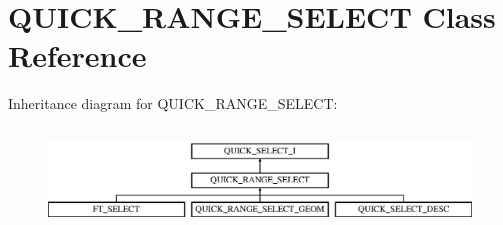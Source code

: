 \hypertarget{classQUICK__RANGE__SELECT}{}\section{Q\+U\+I\+C\+K\+\_\+\+R\+A\+N\+G\+E\+\_\+\+S\+E\+L\+E\+CT Class Reference}
\label{classQUICK__RANGE__SELECT}
Inheritance diagram for Q\+U\+I\+C\+K\+\_\+\+R\+A\+N\+G\+E\+\_\+\+S\+E\+L\+E\+CT\+:\begin{figure}[H]
\begin{center}
\leavevmode
\includegraphics[height=2.705314cm]{classQUICK__RANGE__SELECT}
\end{center}
\end{figure}
